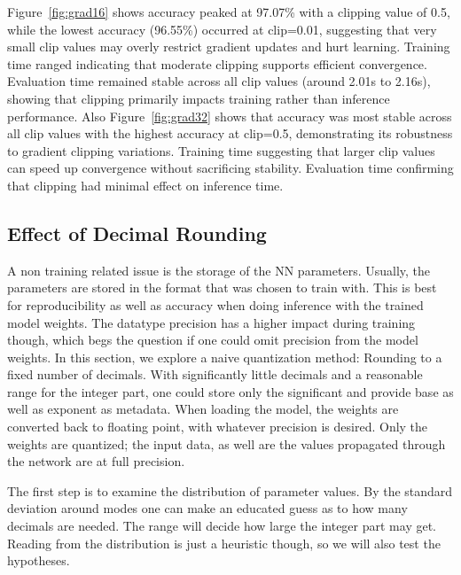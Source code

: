 \documentclass[11pt]{article}
\begin{document}
Figure~\ref{fig:grad16} shows accuracy peaked at 97.07\% with a clipping value
of 0.5, while the lowest accuracy (96.55\%) occurred at clip=0.01, suggesting
that very small clip values may overly restrict gradient updates and hurt
learning. Training time ranged indicating that moderate clipping supports
efficient convergence. Evaluation time remained stable across all clip values
(around 2.01s to 2.16s), showing that clipping primarily impacts training
rather than inference performance. Also Figure~\ref{fig:grad32} shows that
accuracy was most stable across all clip values with the highest accuracy at
clip=0.5, demonstrating its robustness to gradient clipping variations.
Training time suggesting that larger clip values can speed up convergence
without sacrificing stability. Evaluation time confirming that clipping had
minimal effect on inference time.

\subsection*{Effect of Decimal Rounding}

A non training related issue is the storage of the NN parameters. Usually, the
parameters are stored in the format that was chosen to train with. This is best
for reproducibility as well as accuracy when doing inference with the trained
model weights. The datatype precision has a higher impact during training
though, which begs the question if one could omit precision from the model
weights. In this section, we explore a naive quantization method: Rounding to a
fixed number of decimals. With significantly little decimals and a reasonable
range for the integer part, one could store only the significant and provide
base as well as exponent as metadata. When loading the model, the weights are
converted back to floating point, with whatever precision is desired. Only the
weights are quantized; the input data, as well are the values propagated
through the network are at full precision.

The first step is to examine the distribution of parameter values. By the
standard deviation around modes one can make an educated guess as to how many
decimals are needed. The range will decide how large the integer part may get.
Reading from the distribution is just a heuristic though, so we will also test
the hypotheses.
\end{document}
